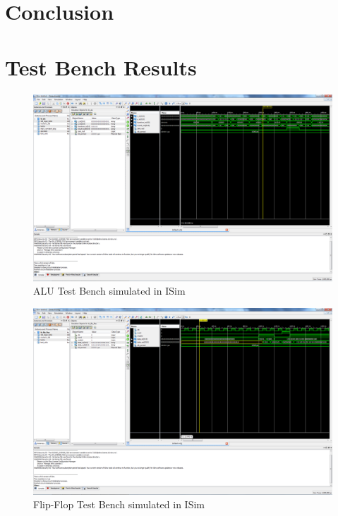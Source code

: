 \chapter{Conclusion}
	

\appendix
\chapter{Test Bench Results}
\begin{figure}
    \includegraphics[width=\textwidth]{illustrations/tb_alu.PNG}
    \caption{ALU Test Bench simulated in ISim}
\end{figure}

\begin{figure}
    \includegraphics[width=\textwidth]{illustrations/tb_flip_flop.PNG}
    \caption{Flip-Flop Test Bench simulated in ISim}
\end{figure}

